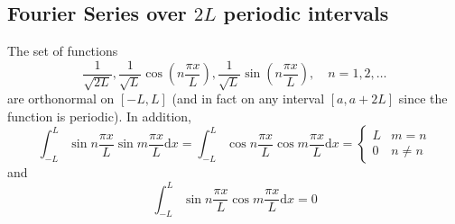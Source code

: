 \documentclass[12pt]{report}
\theoremstyle{definition}
\begin{document}
\subsection{Fourier Series over $2L$ periodic intervals}
The set of functions\[
    \frac{1}{\sqrt{2L}}, \frac{1}{\sqrt{L}}\cos{\left(n\frac{\pi x}{L}\right)}, 
    \frac{1}{\sqrt{L}}\sin{\left(n \frac{\pi x}{L}\right)}, \quad
    n = 1, 2, \ldots
\]are orthonormal on $[-L, L]$ (and in fact on any interval $[a, a+2L]$ since the function is periodic).
In addition,\[
    \int_{-L}^{L} \sin{n\frac{\pi x}{L}}\sin{m \frac{\pi x}{L}}\mathrm{d}x
        = \int_{-L}^{L} \cos{n \frac{\pi x}{L}} \cos{m \frac{\pi x}{L}}\mathrm{d}x = 
        \begin{cases}
            L & m = n \\
            0 & n \neq n
        \end{cases}
\]
and \[
    \int_{-L}^{L} \sin{n \frac{\pi x}{L}} \cos{m \frac{\pi x}{L}} \mathrm{d}x = 0
\]
\end{document}
